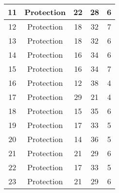 \documentclass[results.tex]{subfiles}
\begin{document}
\begin{center}
\begin{tabular}{| c || c | c | c | c |}
            \hline
            11                      & Protection                   & 22                     & 28                      & 6                    \\
            \hline
            12                      & Protection                   & 18                     & 32                      & 7                    \\
            \hline
            13                      & Protection                   & 18                     & 32                      & 6                    \\
            \hline
            14                      & Protection                   & 16                     & 34                      & 6                    \\
            \hline
            15                      & Protection                   & 16                     & 34                      & 7                    \\
            \hline
            16                      & Protection                   & 12                     & 38                      & 4                    \\
            \hline
            17                      & Protection                   & 29                     & 21                      & 4                    \\
            \hline
            18                      & Protection                   & 15                     & 35                      & 6                    \\
            \hline
            19                      & Protection                   & 17                     & 33                      & 5                    \\
            \hline
            20                      & Protection                   & 14                     & 36                      & 5                    \\
            \hline
            21                      & Protection                   & 21                     & 29                      & 6                    \\
            \hline
            22                      & Protection                   & 17                     & 33                      & 5                    \\
            \hline
            23                      & Protection                   & 21                     & 29                      & 6                    \\

\end{tabular}
\end{center}
\end{document}

